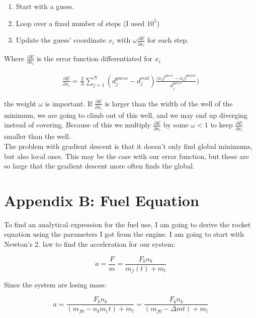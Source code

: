 \documentclass[a4paper, 10pt]{article}
\begin{document}
\begin{enumerate}
\item Start with a guess.
\item Loop over a fixed number of steps (I used $10^{5}$)
\item Update the guess' coordinate $x_i$ with $\omega \frac{\partial E}{\partial x_i}$ for each step.
\end{enumerate}

Where $\frac{\partial E}{\partial x_i}$ is the error function differentiated for $x_i$

\begin{align}\label{eq:gradient}
\frac{\partial E}{\partial x_i} = \frac{2}{N}\sum_{j=1}^N (d_j^{guess} - d_j^{real})\frac{(x_ij^{guess} - x_ij^{planet}}{d_j^{guess}})
\end{align}

the weight $\omega$ is important. If $\frac{\partial E}{\partial x_i}$ is larger than the width of the well of the minimum, we are going to climb out of this well, and we may end up diverging instead of  covering. Because of this we multiply $\frac{\partial E}{\partial x_i}$ by some $\omega < 1$ to keep $\frac{\partial E}{\partial x_i}$ smaller than the well.\\

The problem with gradient descent is that it doesn't only find global minimums, but also local ones. This may be the case with our error function, but these are so large that the gradient descent more often finds the global.

\section{Appendix B: Fuel Equation}\label{sec:Fuel}

To find an analytical expression for the fuel use, I am going to derive the rocket equation using the parameters I got from the engine. I am going to start with Newton's 2. law to find the acceleration for our system:

\begin{equation}
a = \frac{F}{m} = \frac{F_b n_b}{m_f(t) + m_l} 
\end{equation}

Since the system are losing mass:

\begin{equation}
a = \frac{F_b n_b}{(m_{f0} - n_b m_e t) + m_l} = \frac{F_b n_b}{(m_{f0} - \Delta m t) + m_l}
\end{equation} 
\end{document}
